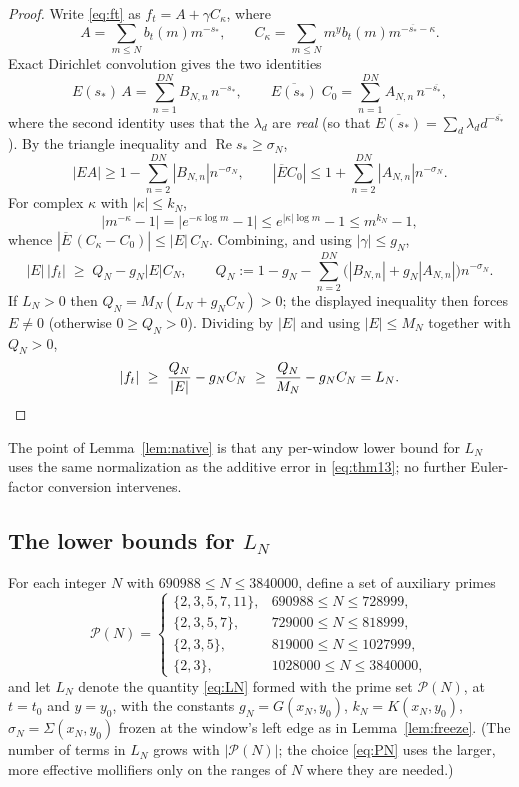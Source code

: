 \documentclass[11pt]{article}
\theoremstyle{definition}
\newcommand{\calP}{\mathcal{P}}
\DeclareMathOperator{\Rea}{Re}
\begin{document}
\begin{proof}
Write \eqref{eq:ft} as $f_t=A+\gamma C_\kappa$, where
\[
A=\sum_{m\le N}b_t(m)m^{-s_*},\qquad
C_\kappa=\sum_{m\le N}m^yb_t(m)m^{-\overline{s_*}-\kappa}.
\]
Exact
Dirichlet convolution gives the two identities
\begin{equation}\label{eq:conv}
E(s_*)\,A=\sum_{n=1}^{DN}B_{N,n}\,n^{-s_*},
\qquad
\overline{E(s_*)}\;C_0=\sum_{n=1}^{DN}A_{N,n}\,n^{-\overline{s_*}} ,
\end{equation}
where the second identity uses that the $\lambda_d$ are \emph{real}
(so that $\overline{E(s_*)}=\sum_d\lambda_d d^{-\overline{s_*}}$).
By the triangle inequality and $\Rea s_*\ge\sigma_N$,
\[
|EA|\ge1-\sum_{n=2}^{DN}|B_{N,n}|n^{-\sigma_N},
\qquad
|\overline EC_0|\le1+\sum_{n=2}^{DN}|A_{N,n}|n^{-\sigma_N}.
\]
For complex $\kappa$ with $|\kappa|\le k_N$,
\begin{equation}\label{eq:kappaest}
|m^{-\kappa}-1|=\bigl|e^{-\kappa\log m}-1\bigr|
\le e^{|\kappa|\log m}-1\le m^{k_N}-1,
\end{equation}
whence $|\overline E\,(C_\kappa-C_0)|\le|E|\,C_N$. Combining, and
using $|\gamma|\le g_N$,
\[
|E|\,|f_t|\;\ge\;Q_N-g_N|E|C_N,
\qquad
Q_N:=1-g_N-\sum_{n=2}^{DN}\bigl(|B_{N,n}|+g_N|A_{N,n}|\bigr)n^{-\sigma_N}.
\]
If $L_N>0$ then $Q_N=M_N(L_N+g_NC_N)>0$; the displayed inequality then
forces $E\ne0$ (otherwise $0\ge Q_N>0$). Dividing by $|E|$ and using
$|E|\le M_N$ together with $Q_N>0$,
\[
|f_t|\ \ge\ \frac{Q_N}{|E|}-g_NC_N
\ \ge\ \frac{Q_N}{M_N}-g_NC_N=L_N. \qedhere
\]
\end{proof}

The point of Lemma~\ref{lem:native} is that any per-window lower bound for
$L_N$ uses the same normalization as the additive error in \eqref{eq:thm13}; no
further Euler-factor conversion intervenes.

\subsection{The lower bounds for \texorpdfstring{$L_N$}{L(N)}}\label{sec:stored}

For each integer $N$ with $690988\le N\le 3840000$, define a set of
auxiliary primes
\begin{equation}\label{eq:PN}
\calP(N)=
\begin{cases}
\{2,3,5,7,11\}, & 690988\le N\le728999,\\
\{2,3,5,7\}, & 729000\le N\le818999,\\
\{2,3,5\}, & 819000\le N\le1027999,\\
\{2,3\}, & 1028000\le N\le3840000,
\end{cases}
\end{equation}
and let $L_N$ denote the quantity \eqref{eq:LN} formed with the
prime set $\calP(N)$, at $t=t_0$ and $y=y_0$, with the constants
$g_N=G(x_N,y_0)$, $k_N=K(x_N,y_0)$, $\sigma_N=\Sigma(x_N,y_0)$
frozen at the window's left edge as in Lemma~\ref{lem:freeze}. (The
number of terms in $L_N$ grows with $|\calP(N)|$; the choice
\eqref{eq:PN} uses the larger, more effective mollifiers only on the
ranges of $N$ where they are needed.)
\end{document}
